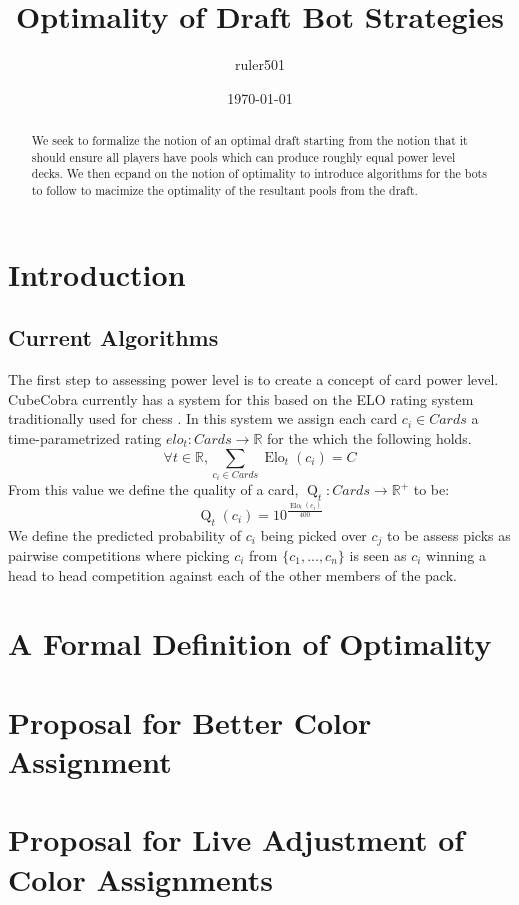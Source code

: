 \documentclass[oneside,12pt]{amsart}
\title{Optimality of Draft Bot Strategies}
\author{ruler501}
\date{\today}
\DeclareMathOperator{\elo}{Elo}
\begin{document}
\begin{abstract}
    We seek to formalize the notion of an optimal draft starting from the
    notion that it should ensure all players have pools which can produce
    roughly equal power level decks. We then ecpand on the notion of
    optimality to introduce algorithms for the bots to follow to macimize
    the optimality of the resultant pools from the draft.
\end{abstract}

\maketitle

\tableofcontents

\section{Introduction}

    \subsection{Current Algorithms}
        The first step to assessing power level is to create a concept of card power
        level. CubeCobra currently has a system for this based on the ELO rating
        system traditionally used for chess . In this system we
        assign each card $c_i \in Cards$ a time-parametrized rating
        $elo_t: Cards \to \mathbb R$  for the which the following holds.
        \begin{equation}\label{eqn:ZeroSumElo}
            \forall t \in \mathbb R, \sum_{c_i \in Cards} \elo_t(c_i) = C
        \end{equation}
        From this value we define the quality of a card, $\operatorname{Q}_t: Cards \to \mathbb R^+$ to be:
        \begin{equation}\label{eqn:LogisticEloQuality}
            \operatorname{Q}_t(c_i) = 10^{\frac{\elo_t(c_i)}{400}}
        \end{equation}
        We define the predicted probability of $c_i$ being picked over $c_j$ to be
        assess picks as pairwise competitions where picking $c_i$ from $\{c_1,...,c_n\}$
        is seen as $c_i$ winning a head to head competition against each of the other
        members of the pack.

\section{A Formal Definition of Optimality}

\section{Proposal for Better Color Assignment}

\section{Proposal for Live Adjustment of Color Assignments}



\end{document}
